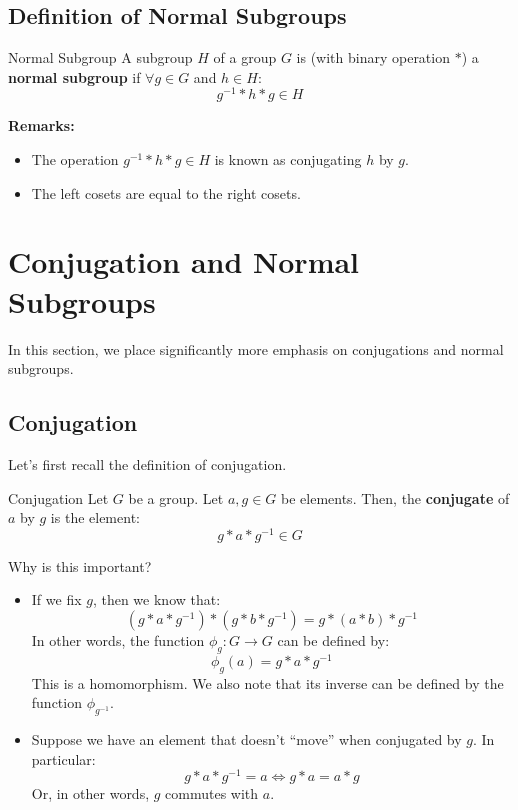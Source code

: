 \documentclass[letterpaper]{article}
\begin{document}
\subsection{Definition of Normal Subgroups}
\begin{definition}{Normal Subgroup}{}
    A subgroup $H$ of a group $G$ is (with binary operation $*$) a \textbf{normal subgroup} if $\forall g \in G$ and $h \in H$: 
    \[g^{-1} * h * g \in H\]
\end{definition}
\textbf{Remarks:}
\begin{itemize}
    \item The operation $g^{-1} * h * g \in H$ is known as conjugating $h$ by $g$. 
    \item The left cosets are equal to the right cosets. 
\end{itemize}




\newpage 
\section{Conjugation and Normal Subgroups}
In this section, we place significantly more emphasis on conjugations and normal subgroups. 

\subsection{Conjugation}
Let's first recall the definition of conjugation.
\begin{definition}{Conjugation}{}
    Let $G$ be a group. Let $a, g \in G$ be elements. Then, the \textbf{conjugate} of $a$ by $g$ is the element: 
    \[g * a * g^{-1} \in G\]
\end{definition}
Why is this important? 
\begin{itemize}
    \item If we fix $g$, then we know that: 
    \[(g * a * g^{-1}) * (g * b * g^{-1}) = g * (a * b) * g^{-1}\]
    In other words, the function $\phi_g: G \to G$ can be defined by: 
    \[\phi_{g}(a) = g * a * g^{-1}\]
    This is a homomorphism. We also note that its inverse can be defined by the function $\phi_{g^{-1}}$.
    
    \item Suppose we have an element that doesn't ``move'' when conjugated by $g$. In particular: 
    \[g * a * g^{-1} = a \iff g * a = a * g\]
    Or, in other words, $g$ commutes with $a$. 
\end{itemize}
\end{document}
